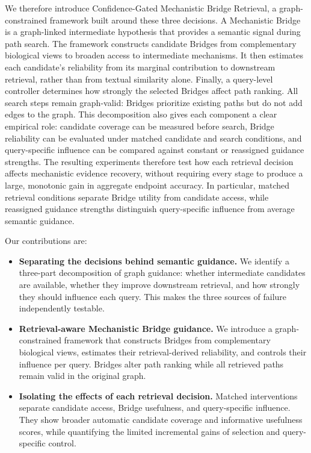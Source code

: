 \documentclass{article} %
\newcommand{\rev}[1]{{\color{blue}#1}}
\begin{document}
We therefore introduce Confidence-Gated Mechanistic Bridge Retrieval, a graph-constrained framework built around these three decisions. A Mechanistic Bridge is a graph-linked intermediate hypothesis that provides a semantic signal during path search. The framework constructs candidate Bridges from complementary biological views to broaden access to intermediate mechanisms. It then estimates each candidate's reliability from its marginal contribution to downstream retrieval, rather than from textual similarity alone. Finally, a query-level controller determines how strongly the selected Bridges affect path ranking. All search steps remain graph-valid: Bridges prioritize existing paths but do not add edges to the graph. This decomposition also gives each component a clear empirical role: candidate coverage can be measured before search, Bridge reliability can be evaluated under matched candidate and search conditions, and query-specific influence can be compared against constant or reassigned guidance strengths. The resulting experiments therefore \rev{test how each retrieval decision affects mechanistic evidence recovery}, without requiring every stage to produce a large, monotonic gain in aggregate endpoint accuracy. In particular, matched retrieval conditions separate Bridge utility from candidate access, while reassigned guidance strengths distinguish query-specific influence from average semantic guidance.


Our contributions are:
\begin{itemize}
    \item \textbf{Separating the decisions behind semantic guidance.}
    We identify a three-part decomposition of graph guidance:
    whether intermediate candidates are available, whether they improve
    downstream retrieval, and how strongly they should influence each
    query. This makes the three sources of failure independently testable.

    \item \textbf{Retrieval-aware Mechanistic Bridge guidance.}
    We introduce a graph-constrained framework that constructs
    Bridges from complementary biological views, estimates their
    retrieval-derived reliability, and controls their influence per
    query. Bridges alter path ranking while all retrieved paths remain
    valid in the original graph.


    \item \textbf{Isolating the effects of each retrieval decision.}
    Matched interventions separate candidate access, Bridge usefulness, and query-specific influence. They show broader automatic candidate coverage and informative usefulness scores, while quantifying \rev{the limited incremental gains of selection and query-specific control.}



\end{itemize}
\end{document}
